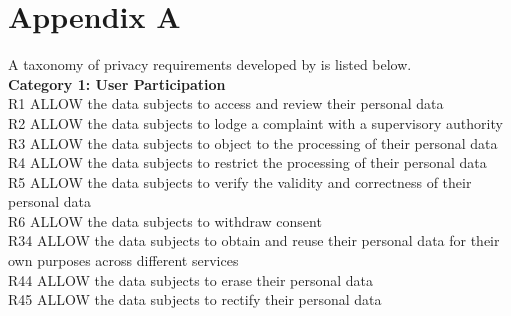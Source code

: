 \pagebreak
\section*{Appendix A}
A taxonomy of privacy requirements developed by \citeauthor{Sangaroonsilp2023} \cite{Sangaroonsilp2023} is listed below. \\

\noindent \textbf{Category 1: User Participation}\\
R1 ALLOW the data subjects to access and review their personal data \\
R2 ALLOW the data subjects to lodge a complaint with a supervisory authority \\
R3 ALLOW the data subjects to object to the processing of their personal data \\
R4 ALLOW the data subjects to restrict the processing of their personal data \\
R5 ALLOW the data subjects to verify the validity and correctness of their personal data \\
R6 ALLOW the data subjects to withdraw consent \\
R34 ALLOW the data subjects to obtain and reuse their personal data for their own purposes across different services \\
R44 ALLOW the data subjects to erase their personal data \\
R45	ALLOW the data subjects to rectify their personal data \\


